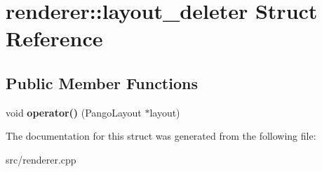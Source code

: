 \hypertarget{structrenderer_1_1layout__deleter}{}\section{renderer\+::layout\+\_\+deleter Struct Reference}
\label{structrenderer_1_1layout__deleter}
\subsection*{Public Member Functions}
\begin{DoxyCompactItemize}
\item 
\mbox{\label{structrenderer_1_1layout__deleter_aadda4fdcfdc2967b9b56faa1a1c6d052}} 
void {\bfseries operator()} (Pango\+Layout $\ast$layout)
\end{DoxyCompactItemize}


The documentation for this struct was generated from the following file\+:\begin{DoxyCompactItemize}
\item 
src/renderer.\+cpp\end{DoxyCompactItemize}
